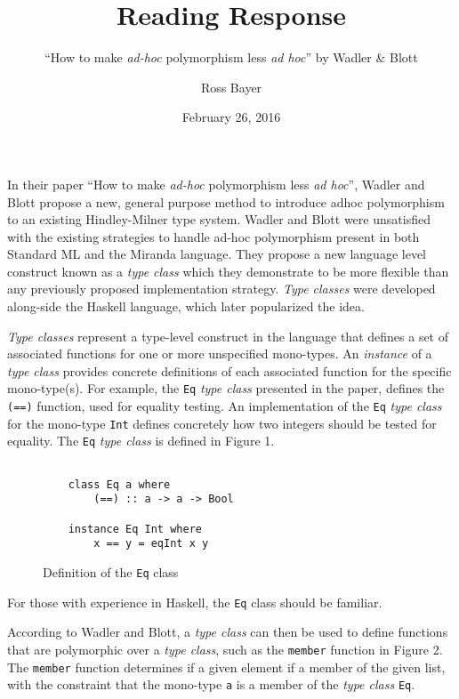 \documentclass[a4paper,fleqn,notitlepage]{scrartcl}
\title{Reading Response}
\subtitle{\normalfont ``How to make {\it ad-hoc} polymorphism less {\it ad hoc}'' by Wadler \& Blott}
\author{Ross Bayer}
\date{February 26, 2016}
\begin{document}
\maketitle


In their paper ``How to make \textit{ad-hoc} polymorphism less \textit{ad hoc}'', 
Wadler and Blott propose a new, general purpose method to introduce adhoc
polymorphism to an existing Hindley-Milner type system. Wadler and Blott were
unsatisfied with the existing strategies to handle ad-hoc polymorphism present
in both Standard ML and the Miranda language. They propose a new language level
construct known as a \textit{type class} which they demonstrate to be more
flexible than any previously proposed implementation strategy.
\textit{Type classes} were developed along-side the Haskell language, which 
later popularized the idea.

\textit{Type classes} represent a type-level construct in the language that
defines a set of associated functions for one or more unspecified mono-types. An
\textit{instance} of a \textit{type class} provides concrete definitions of
each associated function for the specific mono-type(s). For example, the \verb|Eq|
\textit{type class} presented in the paper, defines the \verb|(==)| function,
used for equality testing. An implementation of the \verb|Eq| \textit{type class}
for the mono-type \verb|Int| defines concretely how two integers should be
tested for equality. The \verb|Eq| \textit{type class} is defined in Figure 1.

\begin{figure}
\caption{Definition of the \protect\texttt{Eq} class}
\begin{verbatim}
    
    class Eq a where
        (==) :: a -> a -> Bool
    
    instance Eq Int where
        x == y = eqInt x y

\end{verbatim}
\end{figure}

For those with experience in Haskell, the \verb|Eq| class should be
familiar.

According to Wadler and Blott, a \textit{type class} can then be used to define
functions that are polymorphic over a \textit{type class}, such as the \verb|member|
function in Figure 2. The \verb|member| function determines if a given element
if a member of the given list, with the constraint that the mono-type \verb|a| is
a member of the \textit{type class} \verb|Eq|.
\end{document}
